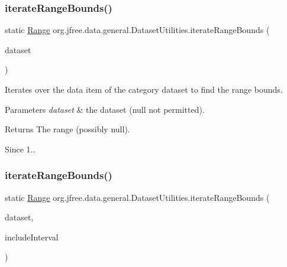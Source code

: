 \subsubsection{\texorpdfstring{iterate\+Range\+Bounds()}{iterateRangeBounds()}\hspace{0.1cm}{\footnotesize\ttfamily [1/4]}}
{\footnotesize\ttfamily static \mbox{\hyperlink{classorg_1_1jfree_1_1data_1_1_range}{Range}} org.\+jfree.\+data.\+general.\+Dataset\+Utilities.\+iterate\+Range\+Bounds (\begin{DoxyParamCaption}\item[{\mbox{\hyperlink{interfaceorg_1_1jfree_1_1data_1_1category_1_1_category_dataset}{Category\+Dataset}}}]{dataset }\end{DoxyParamCaption})\hspace{0.3cm}{\ttfamily [static]}}

Iterates over the data item of the category dataset to find the range bounds.


\begin{DoxyParams}{Parameters}
{\em dataset} & the dataset ({\ttfamily null} not permitted).\\
\hline
\end{DoxyParams}
\begin{DoxyReturn}{Returns}
The range (possibly {\ttfamily null}).
\end{DoxyReturn}
\begin{DoxySince}{Since}
1.. 
\end{DoxySince}
\mbox{\label{classorg_1_1jfree_1_1data_1_1general_1_1_dataset_utilities_ae5aa72f93c4a25f52025f5d0288de9a9}} 
\subsubsection{\texorpdfstring{iterate\+Range\+Bounds()}{iterateRangeBounds()}\hspace{0.1cm}{\footnotesize\ttfamily [2/4]}}
{\footnotesize\ttfamily static \mbox{\hyperlink{classorg_1_1jfree_1_1data_1_1_range}{Range}} org.\+jfree.\+data.\+general.\+Dataset\+Utilities.\+iterate\+Range\+Bounds (\begin{DoxyParamCaption}\item[{\mbox{\hyperlink{interfaceorg_1_1jfree_1_1data_1_1category_1_1_category_dataset}{Category\+Dataset}}}]{dataset,  }\item[{boolean}]{include\+Interval }\end{DoxyParamCaption})\hspace{0.3cm}{\ttfamily [static]}}

